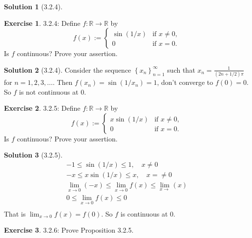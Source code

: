 \documentclass{article}
\theoremstyle{definition}
\newtheorem{exe}{Exercise}[section]
\newtheorem{sol}{Solution}[exe]
\begin{document}
\begin{sol}[3.2.4]
    
\end{sol}


\begin{exe} 3.2.4: Define \( f: \mathbb{R} \rightarrow \mathbb{R} \) by
\[ f(x) := \begin{cases} 
\sin(1/x) & \text{if } x \neq 0, \\
0 & \text{if } x = 0.
\end{cases} \]
Is \( f \) continuous? Prove your assertion.

\end{exe}

\begin{sol}[3.2.4]
Consider the sequence $\left\{x_{n}\right\}_{n=1}^{\infty}$ such that $x_{n}=\frac{1}{(2n+1/2)\pi}$ for $n=1,2,3,\ldots$. Then 
$f(x_n)= \sin(1/x_n)=1$, don't converge to $f(0)=0$. So $f$ is not continuous at 0.
\end{sol}

\begin{exe} 3.2.5: Define \( f: \mathbb{R} \rightarrow \mathbb{R} \) by
\[ f(x) := \begin{cases} 
x \sin(1/x) & \text{if } x \neq 0, \\
0 & \text{if } x = 0.
\end{cases} \]
Is \( f \) continuous? Prove your assertion.

\end{exe} 

\begin{sol}[3.2.5]
    \begin{align*}
        -1\leq \sin (1/x) \leq 1, \quad x \neq 0\\
        -x\leq x \sin(1/x) \leq x, \quad x=\neq 0\\
        \lim_{x\to 0}(-x)\leq \lim_{x\to0}f(x) \leq \lim_{x\to}(x)\\
        0\leq \lim_{x\to 0}f(x) \leq 0\\
    \end{align*}
    That is $\lim_{x\to0}f(x)=f(0)$. So $f$ is continuous at 0.
\end{sol}

\begin{exe} 3.2.6: Prove Proposition 3.2.5.
\end{exe} 
\end{document}
